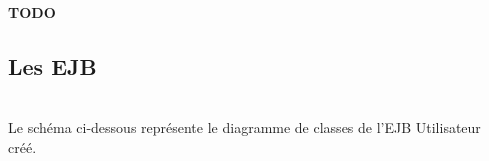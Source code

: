 \documentclass[10pt]{report}
\begin{document}
	\begin{figure}[here]
	      \begin{center}	      
	      \end{center}
	\end{figure}
\textbf{TODO}

\newpage
\subsection{Les EJB}
~\\
Le schéma ci-dessous représente le diagramme de classes de l'EJB Utilisateur créé. \\
	\begin{figure}[hp]
	      \begin{center}
	      \end{center}
	\end{figure}
\\
\end{document}
